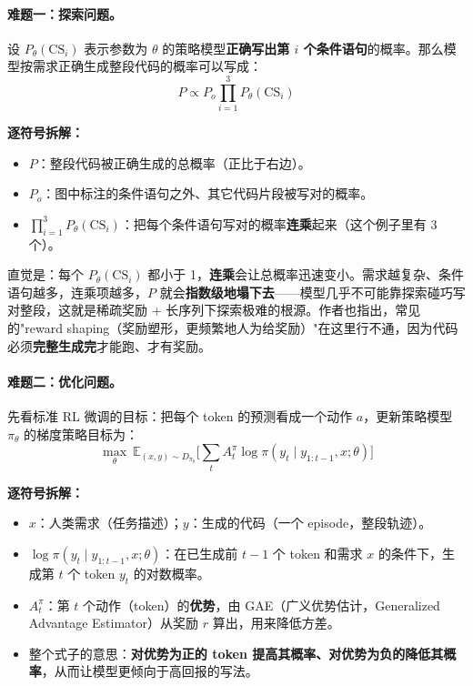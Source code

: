 \documentclass[11pt,UTF8,fontset=fandol]{ctexart}
\begin{document}
\paragraph{难题一：探索问题。} 设 $P_\theta(\mathrm{CS}_i)$ 表示参数为 $\theta$ 的策略模型\textbf{正确写出第 $i$ 个条件语句}的概率。那么模型按需求正确生成整段代码的概率可以写成：
\begin{equation*}
P \propto P_o \prod_{i=1}^{3} P_\theta(\mathrm{CS}_i) \tag{1}
\end{equation*}

\noindent\textbf{逐符号拆解：}
\begin{itemize}[leftmargin=2em]
\item $P$：整段代码被正确生成的总概率（正比于右边）。
\item $P_o$：图中标注的条件语句之外、其它代码片段被写对的概率。
\item $\prod_{i=1}^{3} P_\theta(\mathrm{CS}_i)$：把每个条件语句写对的概率\textbf{连乘}起来（这个例子里有 3 个）。
\end{itemize}

直觉是：每个 $P_\theta(\mathrm{CS}_i)$ 都小于 1，\textbf{连乘}会让总概率迅速变小。需求越复杂、条件语句越多，连乘项越多，$P$ 就会\textbf{指数级地塌下去}——模型几乎不可能靠探索碰巧写对整段，这就是稀疏奖励 + 长序列下探索极难的根源。作者也指出，常见的"reward shaping（奖励塑形，更频繁地人为给奖励）"在这里行不通，因为代码必须\textbf{完整生成完}才能跑、才有奖励。

\paragraph{难题二：优化问题。} 先看标准 RL 微调的目标：把每个 token 的预测看成一个动作 $a$，更新策略模型 $\pi_\theta$ 的梯度策略目标为：
\begin{equation*}
\max_\theta\ \mathbb{E}_{(x,y)\sim D_{\pi_\theta}}\Big[\sum_t A^\pi_t \log \pi(y_t \mid y_{1:t-1}, x; \theta)\Big] \tag{2}
\end{equation*}

\noindent\textbf{逐符号拆解：}
\begin{itemize}[leftmargin=2em]
\item $x$：人类需求（任务描述）；$y$：生成的代码（一个 episode，整段轨迹）。
\item $\log \pi(y_t \mid y_{1:t-1}, x; \theta)$：在已生成前 $t-1$ 个 token 和需求 $x$ 的条件下，生成第 $t$ 个 token $y_t$ 的对数概率。
\item $A^\pi_t$：第 $t$ 个动作（token）的\textbf{优势}，由 GAE（广义优势估计，Generalized Advantage Estimator）从奖励 $r$ 算出，用来降低方差。
\item 整个式子的意思：\textbf{对优势为正的 token 提高其概率、对优势为负的降低其概率}，从而让模型更倾向于高回报的写法。
\end{itemize}
\end{document}
